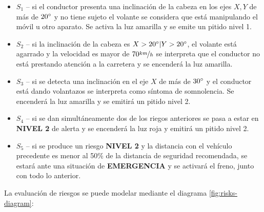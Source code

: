 \begin{enumerate}
\begin{itemize}
          \item $S_1$ -- si el conductor presenta una inclinación de la cabeza en los ejes $X, Y$
                de más de $20\degree$ y no tiene sujeto el volante se considera que está
                manipulando el móvil u otro aparato. Se activa la luz amarilla y se
                emite un pitido nivel 1.
          \item $S_2$ -- si la inclinación de la cabeza es $X > 20\degree | Y > 20\degree$, el volante
                está agarrado y la velocidad es mayor de $70\nicefrac{km}{h}$ se interpreta
                que el conductor no está prestando atención a la carretera y se encenderá la
                luz amarilla.
          \item $S_3$ -- si se detecta una inclinación en el eje $X$ de más de $30\degree$ y el
                conductor está dando volantazos se interpreta como síntoma de somnolencia.
                Se encenderá la luz amarilla y se emitirá un pitido nivel 2.
          \item $S_4$ -- si se dan simultáneamente dos de los riegos anteriores se pasa a estar en
                \textbf{NIVEL 2} de alerta y se encenderá la luz roja y emitirá un pitido
                nivel 2.
          \item $S_5$ -- si se produce un riesgo \textbf{NIVEL 2} y la distancia con el vehículo
                precedente es menor al 50\% de la distancia de seguridad recomendada, se
                estará ante una situación de \textbf{EMERGENCIA} y se activará el freno,
                junto con todo lo anterior.
        \end{itemize}
\end{enumerate}

La evaluación de riesgos se puede modelar mediante el diagrama \ref{fig:risks-diagram}:

